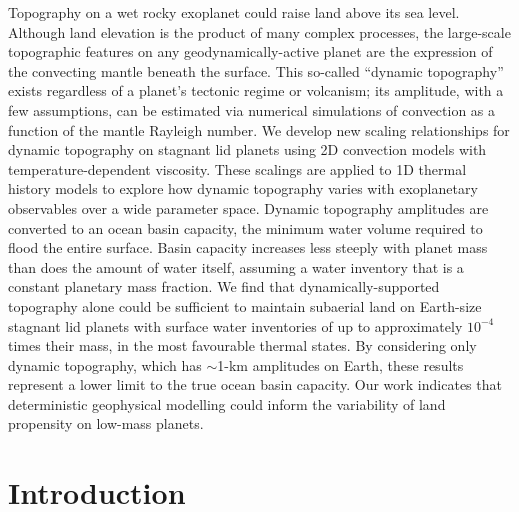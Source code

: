 Topography on a wet rocky exoplanet could raise land above its sea level. Although land elevation is the product of many complex processes, the large-scale topographic features on any geodynamically-active planet are the expression of the convecting mantle beneath the surface. This so-called ``dynamic topography'' exists regardless of a planet's tectonic regime or volcanism; its amplitude, with a few assumptions, can be estimated via numerical simulations of convection as a function of the mantle Rayleigh number. We develop new scaling relationships for dynamic topography on stagnant lid planets using 2D convection models with temperature-dependent viscosity. These scalings are applied to 1D thermal history models to explore how dynamic topography varies with exoplanetary observables over a wide parameter space. Dynamic topography amplitudes are converted to an ocean basin capacity, the minimum water volume required to flood the entire surface. Basin capacity increases less steeply with planet mass than does the amount of water itself, assuming a water inventory that is a constant planetary mass fraction. We find that dynamically-supported topography alone could be sufficient to maintain subaerial land on Earth-size stagnant lid planets with surface water inventories of up to approximately $10^{-4}$ times their mass, in the most favourable thermal states. By considering only dynamic topography, which has $\sim$1-km amplitudes on Earth, these results represent a lower limit to the true ocean basin capacity. Our work indicates that deterministic geophysical modelling could inform the variability of land propensity on low-mass planets.



\section{Introduction}


